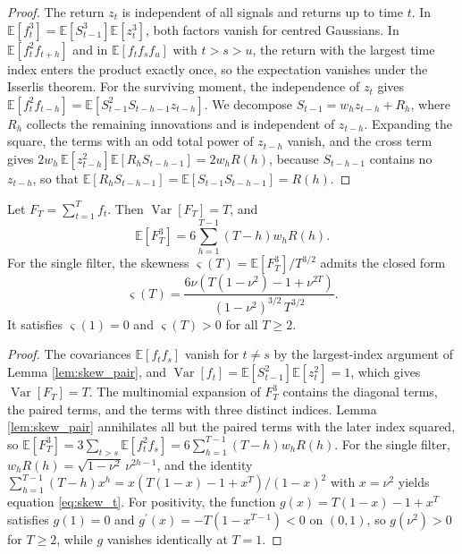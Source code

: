 \documentclass[hidelinks]{siamonline250211}
\DeclareMathOperator{\Var}{Var}
\begin{document}
\begin{proof}
	The return $z_{t}$ is independent of all signals and returns up to time $t$. In $\mathbb{E}\left[f^{3}_{t}\right]=\mathbb{E}\left[S^{3}_{t-1}\right]\mathbb{E}\left[z^{3}_{t}\right]$, both factors vanish for centred Gaussians. In $\mathbb{E}\left[f^{2}_{t}f_{t+h}\right]$ and in $\mathbb{E}\left[f_{t}f_{s}f_{u}\right]$ with $t>s>u$, the return with the largest time index enters the product exactly once, so the expectation vanishes under the Isserlis theorem. For the surviving moment, the independence of $z_{t}$ gives $\mathbb{E}\left[f^{2}_{t}f_{t-h}\right]=\mathbb{E}\left[S^{2}_{t-1}S_{t-h-1}z_{t-h}\right]$. We decompose $S_{t-1}=w_{h}z_{t-h}+R_{h}$, where $R_{h}$ collects the remaining innovations and is independent of $z_{t-h}$. Expanding the square, the terms with an odd total power of $z_{t-h}$ vanish, and the cross term gives $2w_{h}\,\mathbb{E}\left[z^{2}_{t-h}\right]\mathbb{E}\left[R_{h}S_{t-h-1}\right]=2w_{h}R(h)$, because $S_{t-h-1}$ contains no $z_{t-h}$, so that $\mathbb{E}\left[R_{h}S_{t-h-1}\right]=\mathbb{E}\left[S_{t-1}S_{t-h-1}\right]=R(h)$.
\end{proof}

\begin{proposition}\label{pr:skew}
	Let $F_{T}=\sum^{T}_{t=1}f_{t}$. Then $\Var\left[F_{T}\right]=T$, and
	\begin{equation}\label{eq:skew_gen}
		\mathbb{E}\left[F^{3}_{T}\right]=6\sum^{T-1}_{h=1}\left(T-h\right)w_{h}R(h).
	\end{equation}
	For the single filter, the skewness $\varsigma(T)=\mathbb{E}\left[F^{3}_{T}\right]/T^{3/2}$ admits the closed form
	\begin{equation}\label{eq:skew_t}
		\varsigma(T) = \frac{6\nu\left(T\left(1-\nu^{2}\right)-1+\nu^{2T}\right)}{\left(1-\nu^{2}\right)^{3/2}\,T^{3/2}}.
	\end{equation}
	It satisfies $\varsigma(1)=0$ and $\varsigma(T)>0$ for all $T\geq 2$.
\end{proposition}

\begin{proof}
	The covariances $\mathbb{E}\left[f_{t}f_{s}\right]$ vanish for $t\neq s$ by the largest-index argument of Lemma \ref{lem:skew_pair}, and $\Var\left[f_{t}\right]=\mathbb{E}\left[S^{2}_{t-1}\right]\mathbb{E}\left[z^{2}_{t}\right]=1$, which gives $\Var\left[F_{T}\right]=T$. The multinomial expansion of $F^{3}_{T}$ contains the diagonal terms, the paired terms, and the terms with three distinct indices. Lemma \ref{lem:skew_pair} annihilates all but the paired terms with the later index squared, so $\mathbb{E}\left[F^{3}_{T}\right]=3\sum_{t>s}\mathbb{E}\left[f^{2}_{t}f_{s}\right]=6\sum^{T-1}_{h=1}\left(T-h\right)w_{h}R(h)$. For the single filter, $w_{h}R(h)=\sqrt{1-\nu^{2}}\,\nu^{2h-1}$, and the identity $\sum^{T-1}_{h=1}\left(T-h\right)x^{h}=x\left(T\left(1-x\right)-1+x^{T}\right)/\left(1-x\right)^{2}$ with $x=\nu^{2}$ yields equation \eqref{eq:skew_t}. For positivity, the function $g(x)=T\left(1-x\right)-1+x^{T}$ satisfies $g(1)=0$ and $g^{\prime}(x)=-T\left(1-x^{T-1}\right)<0$ on $\left(0,1\right)$, so $g\left(\nu^{2}\right)>0$ for $T\geq 2$, while $g$ vanishes identically at $T=1$.
\end{proof}
\end{document}
